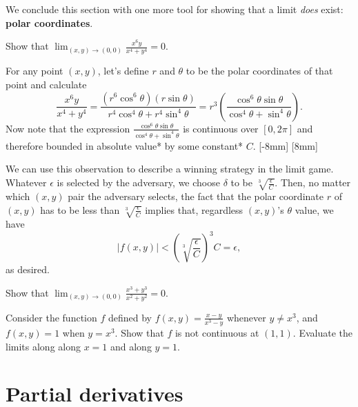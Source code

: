 \documentclass[svgnames]{watsonbook}
\begin{document}
We conclude this section with one more tool for showing that a limit
\textit{does} exist: \textbf{polar coordinates}.

\begin{example}{}{}
  Show that $\displaystyle{\lim_{(x,y) \to (0,0)}\frac{x^6 y}{x^4 + y^4} = 0}$. 
\end{example}

\begin{solution}
  For any point $(x,y)$, let's define $r$ and $\theta$ to be the polar
  coordinates of that point and calculate
  \[
    \frac{x^6 y}{x^4 + y^4} = \frac{(r^6 \cos^6 \theta) (r\sin \theta)}{r^4
      \cos^4 \theta + r^4\sin^4 \theta} = r^3 \left(\frac{\cos^6\theta \sin
      \theta}{ \cos^4 \theta + \sin^4\theta}\right). 
  \]
  Now note that the expression $\frac{\cos^6\theta \sin
      \theta}{ \cos^4 \theta + \sin^4\theta}$ is continuous over
    $[0,2\pi]$ and therefore bounded in absolute value* by some
    constant* $C$. [-8mm]
    [8mm]

    We can use this observation to describe a winning strategy in the
    limit game. Whatever $\epsilon$ is selected by the adversary, we
    choose $\delta$ to be $\sqrt[3]{\frac{\epsilon}{C}}$. Then, 
    no matter which $(x,y)$ pair the adversary selects, the fact that
    the polar coordinate $r$ of $(x,y)$ has to be less than
    $\sqrt[3]{\frac{\epsilon}{C}}$ implies that, regardless $(x,y)$'s
    $\theta$ value, we have 
    \[
      |f(x,y)| <  \left(\sqrt[3]{\frac{\epsilon}{C}}\right)^3 C =
      \epsilon, 
    \]
    as desired. 
  \end{solution}

  \begin{exercise}{}{}
    Show that $\displaystyle{\lim_{(x,y) \to (0,0)} \frac{x^3 + y^3}{x^2 + y^2}} =
    0$. 
  \end{exercise}

  \begin{exercise}{}{}
    Consider the function $f$ defined by $f(x,y) = \frac{x-y}{x^3-y}$
    whenever $y \neq x^3$, and $f(x,y) = 1$ when $y = x^3$. Show that
    $f$ is not continuous at $(1,1)$. Evaluate the limits along along
    $x=1$ and along $y=1$.
  \end{exercise}

  \section{Partial derivatives} \label{sec:partial}
\end{document}
